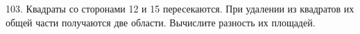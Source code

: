 103. Квадраты со сторонами 12 и 15 пересекаются. При удалении из квадратов их общей части получаются две области. Вычислите разность их площадей.\\
